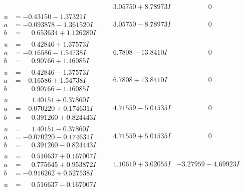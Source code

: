\documentclass[1p]{elsarticle_modified}
\theoremstyle{definition}
\begin{document}
$$\begin{array}{c|c|c}
 & \phantom{-}3.05750 + 8.78973 I & \phantom{-0.000000 } 0 \\ \hline\begin{aligned}
u &= -0.43150 - 1.37321 I \\
a &= -0.093878 - 1.361520 I \\
b &= \phantom{-}0.653634 + 1.126280 I\end{aligned}
 & \phantom{-}3.05750 - 8.78973 I & \phantom{-0.000000 } 0 \\ \hline\begin{aligned}
u &= \phantom{-}0.42846 + 1.37573 I \\
a &= -0.16586 - 1.54738 I \\
b &= \phantom{-}0.90766 + 1.16085 I\end{aligned}
 & \phantom{-}6.7808 - 13.8410 I & \phantom{-0.000000 } 0 \\ \hline\begin{aligned}
u &= \phantom{-}0.42846 - 1.37573 I \\
a &= -0.16586 + 1.54738 I \\
b &= \phantom{-}0.90766 - 1.16085 I\end{aligned}
 & \phantom{-}6.7808 + 13.8410 I & \phantom{-0.000000 } 0 \\ \hline\begin{aligned}
u &= \phantom{-}1.40151 + 0.37860 I \\
a &= -0.070220 + 0.174631 I \\
b &= \phantom{-}0.391260 + 0.824443 I\end{aligned}
 & \phantom{-}4.71559 - 5.01535 I & \phantom{-0.000000 } 0 \\ \hline\begin{aligned}
u &= \phantom{-}1.40151 - 0.37860 I \\
a &= -0.070220 - 0.174631 I \\
b &= \phantom{-}0.391260 - 0.824443 I\end{aligned}
 & \phantom{-}4.71559 + 5.01535 I & \phantom{-0.000000 } 0 \\ \hline\begin{aligned}
u &= \phantom{-}0.516637 + 0.167007 I \\
a &= \phantom{-}0.775645 + 0.953872 I \\
b &= -0.916262 + 0.527538 I\end{aligned}
 & \phantom{-}1.10619 + 3.02055 I & -3.27959 - 4.69923 I \\ \hline\begin{aligned}
u &= \phantom{-}0.516637 - 0.167007 I \\

\end{aligned}
\end{array}$$
\end{document}
